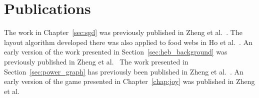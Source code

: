 \section{Publications}

The work in Chapter~\ref{sec:sgd} was previously published in Zheng et al.\ \cite{Zheng2019Stochastic}. The layout algorithm developed there was also applied to food webs in Ho et al.\ \cite{Ho2019}.
An early version of the work presented in Section~\ref{sec:heb_background} was previously published in Zheng et al.\ \cite{Zheng2018}
The work presented in Section~\ref{sec:power_graph} has previously been published in Zheng et al.\ \cite{Zheng2019Power}.
An early version of the game presented in Chapter~\ref{chap:joy} was published in Zheng et al.\ \cite{Zheng2019Eco}